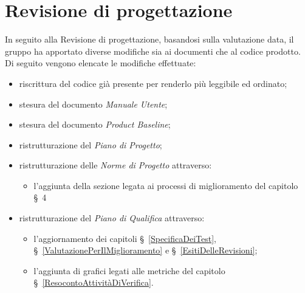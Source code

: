 \section{Revisione di progettazione}\label{EsitiDelleRevisioniRevisioneDiProgettazione}

In seguito alla Revisione di progettazione, basandosi sulla valutazione data, il gruppo ha apportato diverse modifiche sia ai documenti che al codice prodotto. Di seguito vengono elencate le modifiche effettuate:
\begin{itemize}
	\item riscrittura del codice già presente per renderlo più leggibile ed ordinato;
	\item stesura del documento \textit{Manuale Utente};
	\item stesura del documento \textit{Product Baseline};
	\item ristrutturazione del \textit{Piano di Progetto};
	\item ristrutturazione delle \textit{Norme di Progetto} attraverso:
	\begin{itemize}
		\item l'aggiunta della sezione legata ai processi di miglioramento del capitolo \S~4
	\end{itemize}
	\item ristrutturazione del \textit{Piano di Qualifica} attraverso:
	\begin{itemize}
		\item l'aggiornamento dei capitoli \S~\ref{SpecificaDeiTest}, \S~\ref{ValutazionePerIlMiglioramento} e \S~\ref{EsitiDelleRevisioni};
		\item l'aggiunta di grafici legati alle metriche del capitolo \S~\ref{ResocontoAttivitàDiVerifica}.
	\end{itemize}
\end{itemize}